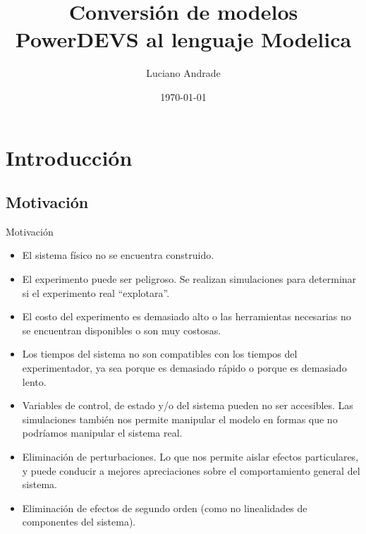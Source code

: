 \documentclass{beamer}
\title{Conversión de modelos PowerDEVS al lenguaje Modelica} %
\author{Luciano Andrade} %
\institute[UNR] %
{
Universidad Nacional de Rosario\\ %
\medskip
\textit{andrade.luciano@gmail.com} %
}
\date{\today} %
\begin{document}
\newcommand{\quotes}[1]{``#1''}

\begin{frame}
\titlepage %
\end{frame}


\chapter{Introducción}
\section{Motivación}
\begin{frame}{Motivación}
\begin{itemize}
	\item<1-> El sistema físico no se encuentra construido. 
	
	\item<2-> El experimento puede ser peligroso. Se realizan simulaciones para determinar si el experimento real \quotes{explotara}.

	\item<3-> El costo del experimento es demasiado alto o las herramientas necesarias no se encuentran disponibles o son muy costosas.

	\item<4-> Los tiempos del sistema no son compatibles con los tiempos del experimentador, ya sea porque es demasiado rápido o porque es demasiado lento.

	\item<5-> Variables de control, de estado y/o del sistema pueden no ser accesibles. Las simulaciones también nos permite manipular el modelo en formas que no podríamos manipular el sistema real.

	\item<6-> Eliminación de perturbaciones. Lo que nos permite aislar efectos particulares, y puede conducir a mejores apreciaciones sobre el comportamiento general del sistema.

	\item<7-> Eliminación de efectos de segundo orden (como no linealidades de componentes del sistema). %
\end{itemize}
\end{frame}
\end{document}
